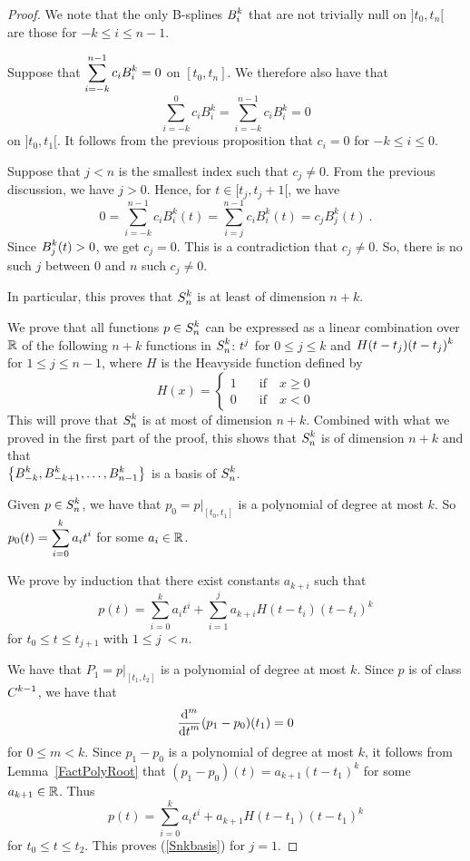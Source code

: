 \begin{proof}
We note that the only B-splines $\DS B_i^k$ that are not
trivially null on $]t_0,t_n[$ are those for $-k \leq i \leq n-1$.

Suppose that $\DS \sum_{i=-k}^{n-1} c_i B_i^k = 0$ on $[t_0,t_n]$.
We therefore also have that
\[
  \sum_{i=-k}^0 c_i B_i^k = \sum_{i=-k}^{n-1} c_i B_i^k = 0
\]
on $]t_0,t_1[$.  It follows from the previous proposition that
$c_i = 0$ for $-k \leq i \leq 0$.

Suppose that $j<n$ is the smallest index such that $c_j\neq 0$.  From
the previous discussion, we have $j>0$.  Hence, for
$t \in [t_j,t_j+1[$, we have
\[
 0 = \sum_{i=-k}^{n-1} c_i B_i^k(t) = \sum_{i=j}^{n-1} c_i B_i^k(t) =
  c_j B_j^k(t) \ .
\]
Since $\DS B_j^k(t) > 0$, we get $c_j = 0$.  This is a
contradiction that $c_j \neq 0$.  So, there is no such $j$ between $0$
and $n$ such $c_j \neq 0$.

In particular, this proves that $\DS S_n^k$ is at least of dimension
$n+k$. 

We prove that all functions $\DS p \in S_n^k$ can be
expressed as a linear combination over $\RR$ of the following $n+k$
functions in $\DS S_n^k$:
$\DS t^j$ for $0\leq j \leq k$ and
$\DS H(t-t_j)(t-t_j)^k$ for
$1\leq j \leq n-1$, where $H$ is the Heavyside function defined by
\[
  H(x) = \begin{cases} 1 & \quad \text{if} \quad x \geq 0 \\
    0 & \quad \text{if} \quad x < 0
  \end{cases}
\]
This will prove that $\DS S_n^k$ is at most of dimension
$n+k$.  Combined with what we proved in the first part of the proof,
this shows that $\DS S_n^k$ is of dimension $n+k$ and that\\
$\DS \left\{ B_{-k}^k, B_{-k+1}^k, \ldots , B_{n-1}^k \right\}$
is a basis of $\DS S_n^k$.

Given $\DS p \in S_n^k$, we have that
$p_0 = p\big|_{[t_0,t_1]}$ is a polynomial of degree at most $k$.  So
$\DS p_0(t) = \sum_{i=0}^k a_i t^i$ for some $a_i \in \RR$.

We prove by induction that there exist constants $a_{k+i}$ such that
\begin{equation}\label{Snkbasis}
  p(t) =  \sum_{i=0}^k a_i t^i + \sum_{i=1}^j a_{k+i}H(t-t_i)(t-t_i)^k
\end{equation}
for $t_0 \leq t \leq t_{j+1}$ with $1 \leq j\ < n$.

We have that $P_1 = p\big|_{[t_1,t_2]}$ is a polynomial of degree at
most $k$.  Since $p$ is of class $\DS C^{k-1}$, we have that
\[
  \dfdxn{(p_1 - p_0)(t_1)}{t}{m} = 0
\]
for $0 \leq m < k$.  Since $p_1-p_0$ is a
polynomial of degree at most $k$, it follows from
Lemma~\ref{FactPolyRoot} that
$(p_1-p_0)(t) = a_{k+1} (t- t_1)^k$ for some $a_{k+1} \in \RR$.
Thus
\[
  p(t) =  \sum_{i=0}^k a_i t^i + a_{k+1}H(t-t_1)(t-t_1)^k
\]
for $t_0 \leq t \leq t_2$.  This proves (\ref{Snkbasis}) for $j=1$.


\end{proof}
